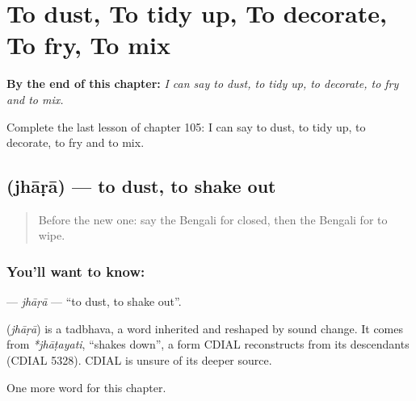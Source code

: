 
\chapter{To dust, To tidy up, To decorate, To fry, To mix}
\label{ch:bn-to-dust-to-tidy-up-to-decorate-to-fry-to-mix}

\begin{chapteropening}
\textbf{By the end of this chapter:} \emph{I can say to dust, to tidy up, to decorate, to fry and to mix.}

Complete the last lesson of chapter 105: I can say to dust, to tidy up, to decorate, to fry and to mix.
\end{chapteropening}

\section[\texorpdfstring{\bn{ঝাড়া} (jhāṛā)}{ঝাড়া (jhāṛā)}]{ (jhāṛā) — to dust, to shake out}

\label{lesson:BN-C105-jhara}



\begin{quote}
Before the new one: say the Bengali for closed, then the Bengali for to wipe.
\end{quote}

\subsection*{You'll want to know: }
\textbf{} — \emph{jhāṛā} — \textquotedblleft{}to dust, to shake out\textquotedblright{}.

\begin{cousinweb}
\textbf{} (\emph{jhāṛā}) is a tadbhava, a word inherited and reshaped by sound change. It comes from \emph{*jhāṭayati}, \textquotedblleft{}shakes down\textquotedblright{}, a form CDIAL reconstructs from its descendants (CDIAL 5328). CDIAL is unsure of its deeper source.
\end{cousinweb}

\begin{grammarlens}[title={What you've built}]
One more word for this chapter.
\end{grammarlens}

